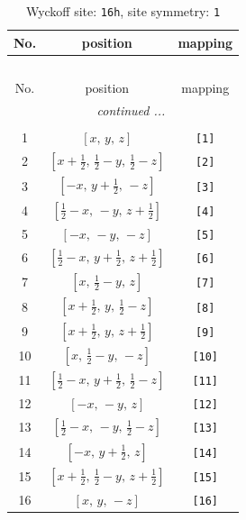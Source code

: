 \documentclass[fleqn,8pt]{jsarticle}
\begin{document}
\begin{longtable}{ccc}
\caption{Wyckoff site: {\tt 16h}, site symmetry: {\tt 1}}
 \\
 \hline \hline
No. & position & mapping \\ \hline \endfirsthead

\multicolumn{2}{l}{\tablename\ \thetable{}} \\
 \hline \hline
No. & position & mapping \\ \hline \endhead

 \hline \hline
\multicolumn{2}{r}{\footnotesize\it continued ...} \\ \endfoot

 \hline \hline
\multicolumn{2}{r}{} \\ \endlastfoot

1 & $\left[ x,\, y,\, z \right]$ & {\tt [1]} \\ \hline
2 & $\left[ x + \frac{1}{2},\, \frac{1}{2} - y,\, \frac{1}{2} - z \right]$ & {\tt [2]} \\ \hline
3 & $\left[ - x,\, y + \frac{1}{2},\, - z \right]$ & {\tt [3]} \\ \hline
4 & $\left[ \frac{1}{2} - x,\, - y,\, z + \frac{1}{2} \right]$ & {\tt [4]} \\ \hline
5 & $\left[ - x,\, - y,\, - z \right]$ & {\tt [5]} \\ \hline
6 & $\left[ \frac{1}{2} - x,\, y + \frac{1}{2},\, z + \frac{1}{2} \right]$ & {\tt [6]} \\ \hline
7 & $\left[ x,\, \frac{1}{2} - y,\, z \right]$ & {\tt [7]} \\ \hline
8 & $\left[ x + \frac{1}{2},\, y,\, \frac{1}{2} - z \right]$ & {\tt [8]} \\ \hline
9 & $\left[ x + \frac{1}{2},\, y,\, z + \frac{1}{2} \right]$ & {\tt [9]} \\ \hline
10 & $\left[ x,\, \frac{1}{2} - y,\, - z \right]$ & {\tt [10]} \\ \hline
11 & $\left[ \frac{1}{2} - x,\, y + \frac{1}{2},\, \frac{1}{2} - z \right]$ & {\tt [11]} \\ \hline
12 & $\left[ - x,\, - y,\, z \right]$ & {\tt [12]} \\ \hline
13 & $\left[ \frac{1}{2} - x,\, - y,\, \frac{1}{2} - z \right]$ & {\tt [13]} \\ \hline
14 & $\left[ - x,\, y + \frac{1}{2},\, z \right]$ & {\tt [14]} \\ \hline
15 & $\left[ x + \frac{1}{2},\, \frac{1}{2} - y,\, z + \frac{1}{2} \right]$ & {\tt [15]} \\ \hline
16 & $\left[ x,\, y,\, - z \right]$ & {\tt [16]} \\
\end{longtable}
\end{document}
